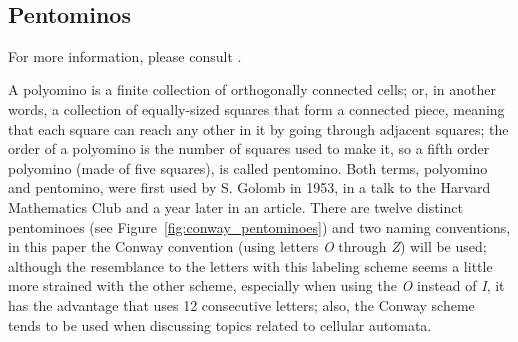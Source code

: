 ~%

\subsection{Pentominos}
For more information, please consult \cite{language-and-automata-journal,
polyomino-life-wiki, rit-people, rpentomino-life-wiki, methuselah-life-wiki}.

A polyomino is a finite collection of orthogonally connected cells; or, in
another words, a collection of equally-sized squares that form a connected
piece, meaning that each square can reach any other in it by going through
adjacent squares; the order of a polyomino is the number of squares used to
make it, so a fifth order polyomino (made of five squares), is called
pentomino. Both terms, polyomino and pentomino, were first used by S. Golomb in
1953, in a talk to the Harvard Mathematics Club and a year later in an article.
There are twelve distinct pentominoes (see
Figure~\ref{fig:conway_pentominoes}) and two naming conventions, in
this paper the Conway convention (using letters \textit{O} through \textit{Z})
will be used; although the resemblance to the letters with this labeling scheme
seems a little more strained with the other scheme, especially when using the
\textit{O} instead of \textit{I}, it has the advantage that uses 12
consecutive letters; also, the Conway scheme tends to be used when discussing
topics related to cellular automata.

